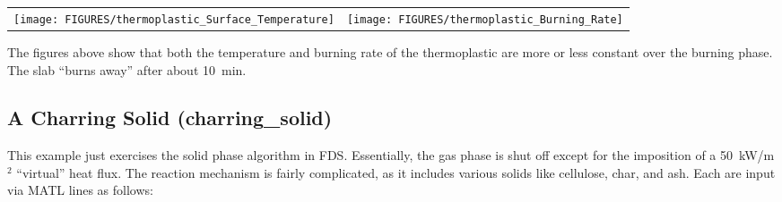 \documentclass[11pt]{book}
\begin{document}
\noindent
\begin{tabular*}{\textwidth}{lr}
\texttt{[image: FIGURES/thermoplastic\_Surface\_Temperature]} &
\texttt{[image: FIGURES/thermoplastic\_Burning\_Rate]}
\end{tabular*}

The figures above show that both the temperature and burning rate of the thermoplastic are more or less constant over
the burning phase. The slab ``burns away'' after about 10~min.






\clearpage
\subsection{A Charring Solid ({\bf charring\_solid}) }

This example just exercises the solid phase algorithm in FDS. Essentially, the gas phase is shut off except for the imposition of a 50~kW/m$^2$ ``virtual''
heat flux. The reaction mechanism is fairly complicated, as it includes various solids like cellulose, char, and ash. Each are input via {\ct MATL} lines
as follows:
\end{document}

